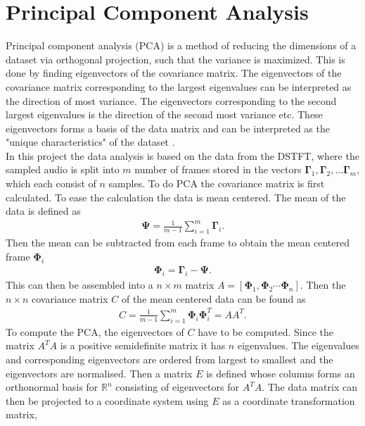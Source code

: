 \section{Principal Component Analysis}
Principal component analysis (PCA) is a method of reducing the dimensions of a dataset via orthogonal projection, such that the variance is maximized. This is done by finding eigenvectors of the covariance matrix.
The eigenvectors of the covariance matrix corresponding to the largest eigenvalues can be interpreted as the direction of most variance. The eigenvectors corresponding to the second largest eigenvalues is the direction of the second most variance etc. These eigenvectors forms a basis of the data matrix and can be interpreted as the "unique characteristics" of the dataset \cite[561]{patternmachineleaning}.\\ 
In this project the data analysis is based on the data from the DSTFT, where
the sampled audio is split into $m$ number of frames stored in the vectors $\mathbf{\Gamma}_1, \mathbf{\Gamma}_2,\hdots\mathbf{\Gamma}_m$, which each consist of $n$ samples.
To do PCA the covariance matrix is first calculated. To ease the calculation the data is mean centered. The mean of the data is defined as
\begin{align*}
    \mathbf{\Psi}=\frac{1}{m-1}\sum_{i=1}^m \mathbf{\Gamma}_i.
\end{align*}
Then the mean can be subtracted from each frame to obtain the mean centered frame $\mathbf{\Phi}_i$
\begin{align*}
    \mathbf{\Phi}_i=\mathbf{\Gamma}_i-\mathbf{\Psi}.
\end{align*}
This can then be assembled into a $n\times m$ matrix $A=[\mathbf{\Phi}_1,\mathbf{\Phi}_2\cdots\mathbf{\Phi}_n]$. Then the $n\times n$ covariance matrix $C$ of the mean centered data can be found as
\begin{align*}
    C=\frac{1}{m-1}\sum_{i=1}^m\mathbf{\Phi}_i\mathbf{\Phi}_i^T=AA^T. 
\end{align*}
To compute the PCA, the eigenvectors of $C$ have to be computed. Since the matrix $A^TA$ is a positive semidefinite matrix it has $n$ eigenvalues. The eigenvalues and corresponding eigenvectors are ordered from largest to smallest and the eigenvectors are normalised. Then a matrix $E$ is defined whose columns forms an orthonormal basis for $\mathbb{R}^n$ consisting of eigenvectors for $A^TA$. 
The data matrix can then be projected to a coordinate system using $E$ as a coordinate transformation matrix,
